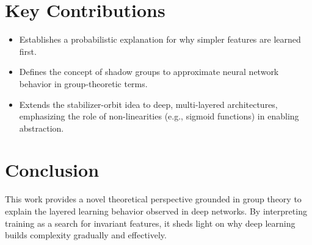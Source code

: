 \documentclass[12pt]{article}
\begin{document}
\section*{Key Contributions}
\begin{itemize}
    \item Establishes a probabilistic explanation for why simpler features are learned first.
    \item Defines the concept of shadow groups to approximate neural network behavior in group-theoretic terms.
    \item Extends the stabilizer-orbit idea to deep, multi-layered architectures, emphasizing the role of non-linearities (e.g., sigmoid functions) in enabling abstraction.
\end{itemize}

\section*{Conclusion}
This work provides a novel theoretical perspective grounded in group theory to explain the layered learning behavior observed in deep networks. By interpreting training as a search for invariant features, it sheds light on why deep learning builds complexity gradually and effectively.
\end{document}
